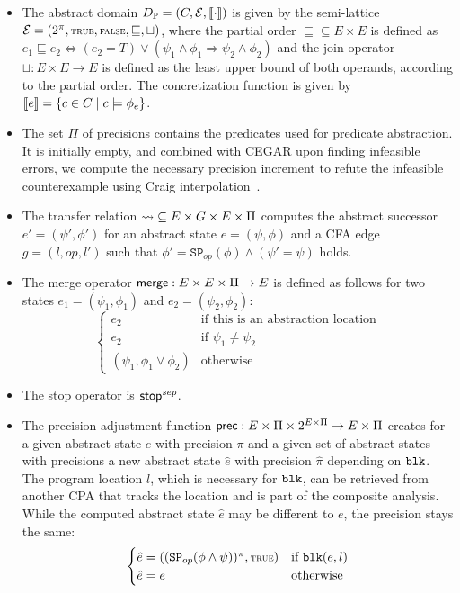 \begin{itemize}
\item The abstract domain $D_{\mathbb{P}} = (C, \mathcal{E}, \left\llbracket \cdot \right\rrbracket)$ is given by the semi-lattice $\mathcal{E} = (2^\pi, \text{\true{}}, \text{\false{}}, \sqsubseteq, \sqcup)$, where the partial order $\sqsubseteq \subseteq E \times E$ is defined as
$e_1 \sqsubseteq e_2 \iff (e_2 = T) \lor (\psi_1 \land \phi_1 \Rightarrow \psi_2 \land \phi_2)$ and the join operator $\sqcup: E \times E \rightarrow E$ is defined as the least upper bound of both operands, according to the partial order. The concretization function is given by $\left\llbracket e \right\rrbracket = \{c \in C \;|\; c \models \phi_e\}$.

\item The set $\Pi$ of precisions contains the predicates used for predicate abstraction. It is initially empty, and combined with \ac{CEGAR} upon finding infeasible errors, we compute the necessary precision increment to refute the infeasible counterexample using Craig interpolation~\cite{Craig:Interpolation}.

\item The transfer relation  $\operatorname{\leadsto} \subseteq E \times G \times E \times \Pi$ computes the abstract successor $e' = (\psi', \phi')$ for an abstract state $e = (\psi, \phi)$ and a \ac{CFA} edge $g = (l, op, l')$ such that
$\phi' = \mathtt{SP}_{op}(\phi) \land (\psi' = \psi)$ holds.

\item The merge operator $\operatorname{\mathsf{merge}} : E \times E \times \Pi \rightarrow E$ is defined as follows for two states $e_1 = (\psi_1, \phi_1)$ and $e_2 = (\psi_2, \phi_2)$:
\begin{displaymath}
\begin{cases}
e_2 & \text{if this is an abstraction location}\\
e_2 & \text{if } \psi_1 \neq \psi_2 \\
(\psi_1, \phi_1 \lor \phi_2) & \text{otherwise}
\end{cases}
\end{displaymath}

\item The stop operator is $\operatorname{\mathsf{stop}}^{sep}$.

\item The precision adjustment function $\operatorname{\mathsf{prec}} : E \times \Pi \times 2^{E\times \Pi} \rightarrow E \times \Pi$ creates for a given abstract state $e$ with precision $\pi$ and a given set of abstract states with precisions a new abstract state $\hat{e}$ with precision $\hat{\pi}$ depending on $\mathtt{blk}{}$. The program location $l$, which is necessary for $\mathtt{blk}{}$, can be retrieved from another CPA that tracks the location and is part of the composite analysis. While the computed abstract state $\hat{e}$ may be different to $e$, the precision stays the same:
\begin{displaymath}
\begin{cases}
\hat{e} = ((\mathtt{SP}_{op}(\phi \land \psi))^{\pi}, \text{\true{}}) & \text{if } \blk{}(e, l)\\
\hat{e} = e & \text{otherwise}
\end{cases}
\end{displaymath}


\end{itemize}
